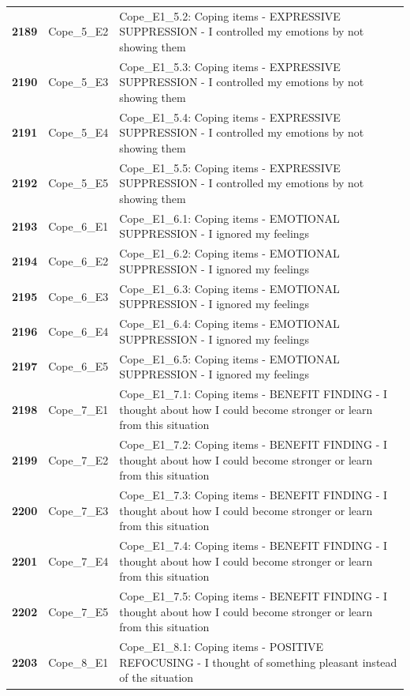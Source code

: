 \documentclass[
  letterpaper,
  DIV=11,
  numbers=noendperiod]{scrartcl}
\begin{document}
\begin{longtable}[t]{>{}cll}
\textbf{2189} & Cope\_5\_E2 & Cope\_E1\_5.2: Coping items - EXPRESSIVE SUPPRESSION - I controlled my emotions by not showing them\\
\textbf{2190} & Cope\_5\_E3 & Cope\_E1\_5.3: Coping items - EXPRESSIVE SUPPRESSION - I controlled my emotions by not showing them\\
\addlinespace
\textbf{2191} & Cope\_5\_E4 & Cope\_E1\_5.4: Coping items - EXPRESSIVE SUPPRESSION - I controlled my emotions by not showing them\\
\textbf{2192} & Cope\_5\_E5 & Cope\_E1\_5.5: Coping items - EXPRESSIVE SUPPRESSION - I controlled my emotions by not showing them\\
\textbf{2193} & Cope\_6\_E1 & Cope\_E1\_6.1: Coping items - EMOTIONAL SUPPRESSION - I ignored my feelings\\
\textbf{2194} & Cope\_6\_E2 & Cope\_E1\_6.2: Coping items - EMOTIONAL SUPPRESSION - I ignored my feelings\\
\textbf{2195} & Cope\_6\_E3 & Cope\_E1\_6.3: Coping items - EMOTIONAL SUPPRESSION - I ignored my feelings\\
\addlinespace
\textbf{2196} & Cope\_6\_E4 & Cope\_E1\_6.4: Coping items - EMOTIONAL SUPPRESSION - I ignored my feelings\\
\textbf{2197} & Cope\_6\_E5 & Cope\_E1\_6.5: Coping items - EMOTIONAL SUPPRESSION - I ignored my feelings\\
\textbf{2198} & Cope\_7\_E1 & Cope\_E1\_7.1: Coping items - BENEFIT FINDING - I thought about how I could become stronger or learn from this situation\\
\textbf{2199} & Cope\_7\_E2 & Cope\_E1\_7.2: Coping items - BENEFIT FINDING - I thought about how I could become stronger or learn from this situation\\
\textbf{2200} & Cope\_7\_E3 & Cope\_E1\_7.3: Coping items - BENEFIT FINDING - I thought about how I could become stronger or learn from this situation\\
\addlinespace
\textbf{2201} & Cope\_7\_E4 & Cope\_E1\_7.4: Coping items - BENEFIT FINDING - I thought about how I could become stronger or learn from this situation\\
\textbf{2202} & Cope\_7\_E5 & Cope\_E1\_7.5: Coping items - BENEFIT FINDING - I thought about how I could become stronger or learn from this situation\\
\textbf{2203} & Cope\_8\_E1 & Cope\_E1\_8.1: Coping items - POSITIVE REFOCUSING - I thought of something pleasant instead of the situation\\

\end{longtable}
\end{document}
